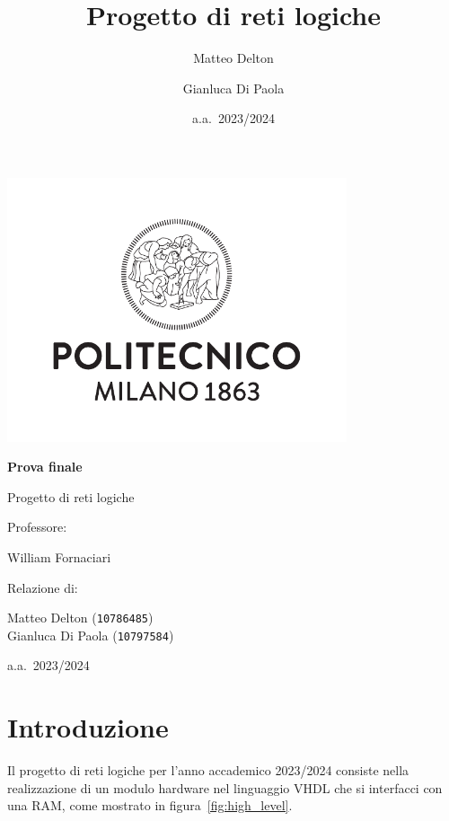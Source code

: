 \documentclass[12pt]{article}
\author{Matteo Delton \and Gianluca Di Paola}
\title{Progetto di reti logiche}
\date{a.a.~2023/2024}
\begin{document}
\begin{titlepage}
    \centering
    \includegraphics[width=0.75\textwidth]{polimi_logo_vertical.pdf}

    \vspace{1cm}

    {\Huge\textbf{Prova finale}\par}
    {\LARGE Progetto di reti logiche\par}
    \vspace{0.5cm}
    Professore: \\
    {\large William Fornaciari\par}

    \vspace{1.5cm}

    Relazione di: \\
    {\large Matteo Delton (\texttt{10786485}) \\ Gianluca Di Paola (\texttt{10797584})\par}

    \vfill
    a.a.~2023/2024
\end{titlepage}

\tableofcontents

\section{Introduzione}

Il progetto di reti logiche per l'anno accademico 2023/2024 consiste nella realizzazione di un modulo hardware nel linguaggio VHDL che si interfacci con una RAM\@, come mostrato in figura~\ref{fig:high_level}.
\end{document}
